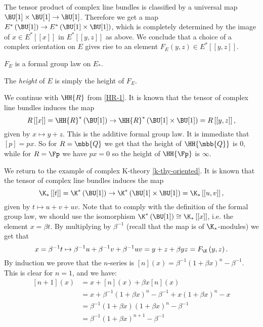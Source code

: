 The tensor product of complex line bundles is classified by a universal map $\BU[1] \times \BU[1] \to \BU[1]$.
Therefore we get a map $E^*\left(\BU[1]\right) \to E^*\left(\BU[1] \times \BU[1]\right)$, which is completely determined by the image of $x \in E^*\left[\left[x\right]\right]$ in $E^*\left[\left[y,z\right]\right]$ as above.
We conclude that a choice of a complex orientation on $E$ gives rise to an element $F_E\left(y,z\right) \in E^*\left[\left[y,z\right]\right]$.

\begin{proposition}
	$F_E$ is a formal group law on $E_*$.
\end{proposition}

\begin{definition}
	The \emph{height} of $E$ is simply the height of $F_E$.
\end{definition}

\begin{example}\label{HR-2}
	We continue with $\HH{R}$ from \ref{HR-1}.
	It is known that the tensor of complex line bundles induces the map
	$$
	R\left[\left[x\right]\right]
	= \HH{R}^*\left(\BU[1]\right)
	\to \HH{R}^*\left(\BU[1] \times \BU[1]\right)
	= R\left[\left[y,z\right]\right],
	$$
	given by $x \mapsto y + z$.
	This is the additive formal group law.
	It is immediate that $\left[p\right] = p x$.
	So for $R = \mbb{Q}$ we get that the height of $\HH{\mbb{Q}}$ is 0, while for $R = \Fp$ we have $p x = 0$ so the height of $\HH{\Fp}$ is $\infty$.
\end{example}

\begin{example}\label{k-thy-fgl}
	We return to the example of complex K-theory \ref{k-thy-oriented}.
	It is known that the tensor of complex line bundles induces the map
	$$
	\K_*\left[\left[t\right]\right]
	= \K^*\left(\BU[1]\right)
	\to \K^*\left(\BU[1] \times \BU[1]\right)
	= \K_*\left[\left[u,v\right]\right],
	$$
	given by $t \mapsto u + v + u v$.
	Note that to comply with the definition of the formal group law, we should use the isomorphism
	$\K^*\left(\BU[1]\right) \cong \K_* \left[\left[x\right]\right]$,
	i.e. the element $x = \beta t$.
	By multiplying by $\beta^{-1}$ (recall that the map is of $\K_*$-modules) we get that
	$$
	x
	= \beta^{-1} t \mapsto \beta^{-1} u + \beta^{-1} v + \beta^{-1} u v
	= y + z + \beta y z
	= F_{\K}\left(y,z\right).
	$$
	By induction we prove that the $n$-series is $\left[n\right]\left(x\right) = \beta^{-1} \left(1 + \beta x\right)^n - \beta^{-1}$.
	This is clear for $n = 1$, and we have:
	\begin{align*}
		\left[n+1\right]\left(x\right)
		&= x + \left[n\right]\left(x\right) + \beta x \left[n\right]\left(x\right)\\
		&= x + \beta^{-1} \left(1 + \beta x\right)^n - \beta^{-1} + x \left(1 + \beta x\right)^n - x\\
		&= \beta^{-1} \left(1 + \beta x\right) \left(1 + \beta x\right)^n - \beta^{-1}\\
		&= \beta^{-1} \left(1 + \beta x\right)^{n+1} - \beta^{-1}
	\end{align*}
\end{example}

